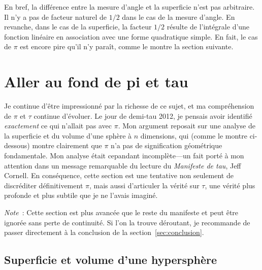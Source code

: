 En bref, la différence entre la mesure d'angle et la superficie n'est pas
arbitraire. \linebreak Il n'y a pas de facteur naturel de $1/2$ dans le cas
de la mesure d'angle. En revanche, dans le cas de la superficie, la facteur $1/2$ résulte de l'intégrale d'une fonction linéaire en association avec une forme quadratique simple. En fait, le cas de $\pi$ est encore pire qu'il n'y paraît, comme le montre la section suivante.


\section{Aller au fond de pi et tau} %
\label{sec:getting_to_the_bottom_of_pi}

Je continue d'être impressionné par la richesse de ce sujet, et ma compréhension de $\pi$ et $\tau$ continue d'évoluer. Le jour de demi-tau 2012, je pensais avoir identifié \emph{exactement} ce qui n'allait pas avec $\pi$. Mon argument reposait sur une analyse de la superficie et du volume d'une sphère à $n$ dimensions, qui (comme le montre ci-dessous) montre clairement que $\pi$ n'a pas de signification géométrique fondamentale. Mon analyse était cepandant incomplète---un fait porté à mon attention dans un message remarquable du lecture du \emph{Manifeste de tau}, Jeff Cornell. En conséquence, cette section est une tentative non seulement de discréditer définitivement $\pi$, mais aussi d'articuler la vérité sur $\tau$, une vérité plus profonde et plus subtile que je ne l'avais imaginé.

\emph{Note}~: Cette section est plus avancée que le reste du manifeste et peut être ignorée sans perte de continuité. Si l'on la trouve déroutant, je recommande de passer directement à la conclusion de la section~\ref{sec:conclusion}.

  \subsection{Superficie et volume d'une hypersphère} %
  \label{sec:volume_of_a_hypersphere}

